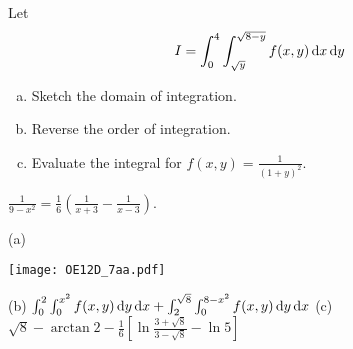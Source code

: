 \begin{question}[M200 2012D] %
Let
\begin{equation*}
I=\int_0^4\int_{\sqrt{y}}^{\sqrt{8-y}} f(x,y)\,\mathrm{d}x\,\mathrm{d}y
\end{equation*}
\begin{enumerate}[(a)]
\item
Sketch the domain of integration.
\item
Reverse the order of integration.
\item
Evaluate the integral for $f(x,y)=\frac{1}{(1+y)^2}$.
\end{enumerate}
 
\end{question}

\begin{hint}
 $\frac{1}{9-x^2} =\frac{1}{6}\left(\frac{1}{x+3}-\frac{1}{x-3}\right)$.
\end{hint}

\begin{answer}
(a)
\begin{center}
     \texttt{[image: OE12D\_7aa.pdf]}
\end{center}

(b) $\int_0^2\int_0^{x^2} f(x,y)\,\mathrm{d}y\,\mathrm{d}x
+\int_2^{\sqrt{8}}\int_0^{8-x^2} f(x,y)\,\mathrm{d}y\,\mathrm{d}x$\qquad
(c) $\sqrt{8}-\arctan 2 -\frac{1}{6}\left[\ln\frac{3+\sqrt{8}}{3-\sqrt{8}}
                                       -\ln 5\right]$
\end{answer}

